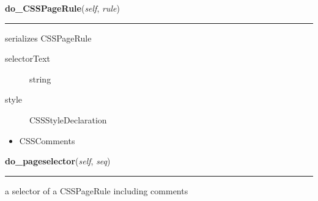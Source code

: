     \label{cssutils:serialize:CSSSerializer:do_CSSPageRule}

    \vspace{0.5ex}

\hspace{.8\funcindent}\begin{boxedminipage}{\funcwidth}

    \raggedright \textbf{do\_CSSPageRule}(\textit{self}, \textit{rule})

    \vspace{-1.5ex}

    \rule{\textwidth}{0.5\fboxrule}
\setlength{\parskip}{2ex}

serializes CSSPageRule
\begin{description}
\item[{selectorText}] \leavevmode 
string

\item[{style}] \leavevmode 
CSSStyleDeclaration

\end{description}
\begin{itemize}
\item {} 
CSSComments

\end{itemize}
\setlength{\parskip}{1ex}
    \end{boxedminipage}

    \label{cssutils:serialize:CSSSerializer:do_pageselector}

    \vspace{0.5ex}

\hspace{.8\funcindent}\begin{boxedminipage}{\funcwidth}

    \raggedright \textbf{do\_pageselector}(\textit{self}, \textit{seq})

    \vspace{-1.5ex}

    \rule{\textwidth}{0.5\fboxrule}
\setlength{\parskip}{2ex}

a selector of a CSSPageRule including comments
\setlength{\parskip}{1ex}
    \end{boxedminipage}

